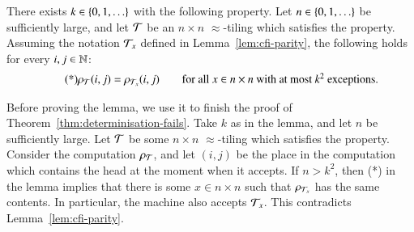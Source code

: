 \begin{lemma} \label{prop:doesnotobserve}
There exists $k \in \{0,1,\ldots\}$ with the following property. Let $n \in \{0,1,\ldots\}$ be sufficiently large, and let ${\mathcal T}$ be an $n \times n$ $\approx$-tiling which satisfies the \cfi property. Assuming the notation ${\mathcal T}_x$ defined in Lemma~\ref{lem:cfi-parity}, the following holds for every $i,j \in {\mathbb N}$:
\begin{align}\tag{*}\label{eq:cfi-conclusion}
 \rho_{\mathcal T}(i,j) = \rho_{{\mathcal T}_x}(i,j) \qquad \mbox{for all $x \in n \times n$ with at most $k^2$ exceptions.}
\end{align}

\end{lemma}

Before proving the lemma, we use it to finish the proof of Theorem~\ref{thm:determinisation-fails}. Take $k$ as in the lemma, and let $n$ be sufficiently large. Let ${\mathcal T}$ be some $n \times n$ $\approx$-tiling which satisfies the \cfi property. Consider the computation $\rho_{\mathcal T}$, and let $(i,j)$ be the place in the computation which contains the head at the moment when it accepts. If $n > k^2$, then (*) in the lemma implies that there is some $x \in n \times n$ such that $\rho_{{\mathcal T}_x}$ has the same contents. In particular, the machine also accepts ${{\mathcal T}_x}$. This contradicts Lemma~\ref{lem:cfi-parity}.

